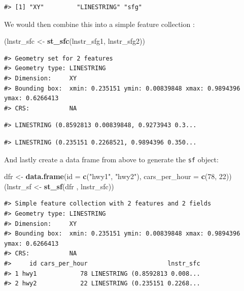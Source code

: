 \documentclass[
]{book}
\newenvironment{Shaded}{\begin{snugshade}}{\end{snugshade}}
\newcommand{\AttributeTok}[1]{\textcolor[rgb]{0.13,0.29,0.53}{#1}}
\newcommand{\DecValTok}[1]{\textcolor[rgb]{0.00,0.00,0.81}{#1}}
\newcommand{\FunctionTok}[1]{\textcolor[rgb]{0.13,0.29,0.53}{\textbf{#1}}}
\newcommand{\NormalTok}[1]{#1}
\newcommand{\OtherTok}[1]{\textcolor[rgb]{0.56,0.35,0.01}{#1}}
\newcommand{\StringTok}[1]{\textcolor[rgb]{0.31,0.60,0.02}{#1}}
\begin{document}
\begin{verbatim}
#> [1] "XY"         "LINESTRING" "sfg"
\end{verbatim}

We would then combine this into a simple feature collection :

\begin{Shaded}
\begin{Highlighting}[]
\NormalTok{(lnstr\_sfc }\OtherTok{\textless{}{-}} \FunctionTok{st\_sfc}\NormalTok{(lnstr\_sfg1, lnstr\_sfg2)) }
\end{Highlighting}
\end{Shaded}

\begin{verbatim}
#> Geometry set for 2 features 
#> Geometry type: LINESTRING
#> Dimension:     XY
#> Bounding box:  xmin: 0.235151 ymin: 0.00839848 xmax: 0.9894396 ymax: 0.6266413
#> CRS:           NA
\end{verbatim}

\begin{verbatim}
#> LINESTRING (0.8592813 0.00839848, 0.9273943 0.3...
\end{verbatim}

\begin{verbatim}
#> LINESTRING (0.235151 0.2268521, 0.9894396 0.350...
\end{verbatim}

And lastly create a data frame from above to generate the \texttt{sf} object:

\begin{Shaded}
\begin{Highlighting}[]
\NormalTok{dfr }\OtherTok{\textless{}{-}} \FunctionTok{data.frame}\NormalTok{(}\AttributeTok{id =} \FunctionTok{c}\NormalTok{(}\StringTok{"hwy1"}\NormalTok{, }\StringTok{"hwy2"}\NormalTok{), }
                  \AttributeTok{cars\_per\_hour =} \FunctionTok{c}\NormalTok{(}\DecValTok{78}\NormalTok{, }\DecValTok{22}\NormalTok{))}
\NormalTok{(lnstr\_sf }\OtherTok{\textless{}{-}} \FunctionTok{st\_sf}\NormalTok{(dfr , lnstr\_sfc))}
\end{Highlighting}
\end{Shaded}

\begin{verbatim}
#> Simple feature collection with 2 features and 2 fields
#> Geometry type: LINESTRING
#> Dimension:     XY
#> Bounding box:  xmin: 0.235151 ymin: 0.00839848 xmax: 0.9894396 ymax: 0.6266413
#> CRS:           NA
#>     id cars_per_hour                      lnstr_sfc
#> 1 hwy1            78 LINESTRING (0.8592813 0.008...
#> 2 hwy2            22 LINESTRING (0.235151 0.2268...
\end{verbatim}
\end{document}
